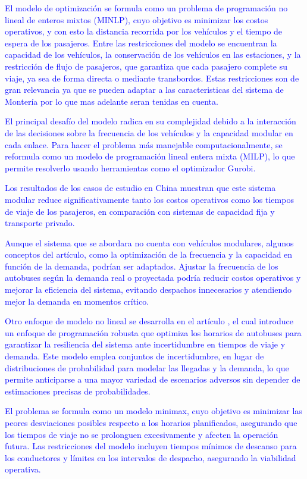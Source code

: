 \documentclass[preprint,11pt]{elsarticle}
\newcommand{\Blue}[1]{\textcolor{blue}{#1}}
\begin{document}
\Blue{El modelo de optimización \cite{guan2023} se formula como un problema de programación no lineal de enteros mixtos (MINLP), cuyo objetivo es minimizar los costos operativos, y con esto la distancia recorrida por los vehículos y el tiempo de espera de los pasajeros. Entre las restricciones del modelo se encuentran la capacidad de los vehículos, la conservación de los vehículos en las estaciones, y la restricción de flujo de pasajeros, que garantiza que cada pasajero complete su viaje, ya sea de forma directa o mediante transbordos. Estas restricciones son de gran relevancia ya que se pueden adaptar a las caracteristicas del sistema de Montería por lo que mas adelante seran tenidas en cuenta.}

\Blue{El principal desafío del modelo radica en su complejidad debido a la interacción de las decisiones sobre la frecuencia de los vehículos y la capacidad modular en cada enlace. Para hacer el problema más manejable computacionalmente, se reformula como un modelo de programación lineal entera mixta (MILP), lo que permite resolverlo usando herramientas como el optimizador Gurobi.}

\Blue{Los resultados de los casos de estudio en China muestran que este sistema modular reduce significativamente tanto los costos operativos como los tiempos de viaje de los pasajeros, en comparación con sistemas de capacidad fija y transporte privado. }

\Blue{Aunque el sistema que se abordara no cuenta con vehículos modulares, algunos conceptos del artículo, como la optimización de la frecuencia y la capacidad en función de la demanda, podrían ser adaptados. Ajustar la frecuencia de los autobuses según la demanda real o proyectada podría reducir costos operativos y mejorar la eficiencia del sistema, evitando despachos innecesarios y atendiendo mejor la demanda en momentos crítico.}

\Blue{Otro enfoque de modelo no lineal se desarrolla en el artículo \cite{gkiotsalitis2019}, el cual introduce un enfoque de programación robusta que optimiza los horarios de autobuses para garantizar la resiliencia del sistema ante incertidumbre en tiempos de viaje y demanda. Este modelo emplea conjuntos de incertidumbre, en lugar de distribuciones de probabilidad para modelar las llegadas y la demanda, lo que permite anticiparse a una mayor variedad de escenarios adversos sin depender de estimaciones precisas de probabilidades.}

\Blue{El problema se formula como un modelo minimax, cuyo objetivo es minimizar las peores desviaciones posibles respecto a los horarios planificados, asegurando que los tiempos de viaje no se prolonguen excesivamente y afecten la operación futura. Las restricciones del modelo incluyen tiempos mínimos de descanso para los conductores y límites en los intervalos de despacho, asegurando la viabilidad operativa.}
\end{document}
